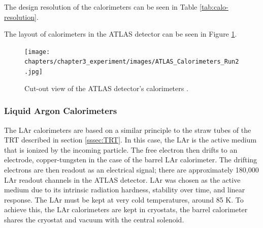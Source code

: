 		The design resolution of the calorimeters can be seen in Table \ref{tab:calo-resolution}.

		\begin{table}[!thp]
		\centering
		\caption{ Design resolution of EM and hadronic calorimeters in the \gls{ATLAS} Detector \cites{LAr-TDR}{ATLAS-tile}.}
		\label{tab:calo-resolution}
		\end{table}

		The layout of calorimeters in the \gls{ATLAS} detector can be seen in Figure \ref{fig:calo-layout}.
		\begin{figure}[!ht]
		\centering
		\texttt{[image: chapters/chapter3\_experiment/images/ATLAS\_Calorimeters\_Run2.jpg]}
		\caption{ Cut-out view of the \gls{ATLAS} detector's calorimeters \cite{atlas-schematics}.}
		\label{fig:calo-layout}
		\end{figure}

		\subsubsection{Liquid Argon Calorimeters}\label{sssec:LAr}
			The \gls{LAr} calorimeters are based on a similar principle to the straw tubes of the \gls{TRT} described in section \ref{sssec:TRT}. In this case, the \gls{LAr} is the active medium that is ionized by the incoming particle. The free electron then drifts to an electrode, copper-tungsten in the case of the barrel \gls{LAr} calorimeter. The drifting electrons are then readout as an electrical signal; there are approximately 180,000 \gls{LAr} readout channels in the \gls{ATLAS} detector. \gls{LAr} was chosen as the active medium due to its intrinsic radiation hardness, stability over time, and linear response. The \gls{LAr} must be kept at very cold temperatures, around 85 K. To achieve this, the \gls{LAr} calorimeters are kept in cryostats, the barrel calorimeter shares the cryostat and vacuum with the central solenoid.

